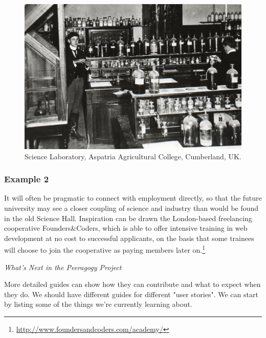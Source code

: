\begin{figure}
\vspace{-.9cm}
\begin{center}
\includegraphics[width=.45\textwidth]{The_Science_Laboratory}
\end{center}
\vspace{-.5cm}
\caption{Science Laboratory, Aspatria Agricultural College, Cumberland, UK. 
\label{science-laboratory}}
\vspace{-.9cm}
\end{figure}

\subsubsection*{Example 2} It will often be pragmatic to connect
 with employment directly, so that
the future university may see a closer coupling of science and
industry than would be found in the old Science Hall.  Inspiration can
be drawn the London-based freelancing cooperative Founders\&Coders,
which is able to offer intensive training in web development at no
cost to successful applicants, on the basis that some trainees will
choose to join the cooperative as paying members later
on.\footnote{\url{http://www.foundersandcoders.com/academy/}}


\begin{framed}
\noindent 
\emph{What's Next in the Peeragogy Project}
\begin{collectinmacro}{\NewcomerWN}{}{}
More detailed guides can show   how they can contribute and what to expect when they do. We should have different guides for different "user stories". We can start by listing some of the things we're currently learning about.
\end{collectinmacro}
\NewcomerWN
\end{framed}

\newpage
